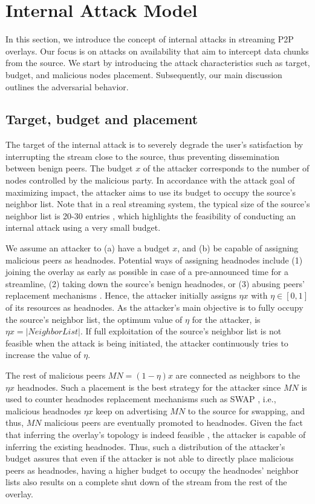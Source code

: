 \section{Internal Attack Model}
\label{sec:Attack}

In this section, we introduce the concept of internal attacks in streaming P2P overlays.
Our focus is on attacks on availability that aim to intercept data chunks from the source. 
We start by introducing the attack characteristics such as target, budget, and malicious nodes placement. 
Subsequently, our main discussion outlines the \drop adversarial behavior. 

\subsection{Target, budget and placement}


The target of the internal attack is to severely degrade the user's satisfaction by interrupting the stream close to the source, thus preventing dissemination between benign peers.
The budget $x$ of the attacker corresponds to the number of nodes controlled by the malicious party. 
In accordance with the attack goal of maximizing impact, the attacker aims to use its budget to occupy the source's neighbor list. 
Note that in a real streaming system, the typical size of the source's neighbor list is 20-30 entries \cite{neighborlist1,neighborlist2}, which highlights the feasibility of conducting an internal attack using a very small budget.


We assume an attacker to (a) have a budget $x$, and (b) be capable of assigning malicious peers as headnodes.
Potential ways of assigning headnodes include (1) joining the overlay as early as possible in case of a pre-announced time for a streamline, (2) taking down the source's benign headnodes, or (3) abusing peers' replacement mechanisms \cite{nguyen2016swap}.
Hence, the attacker initially assigns $\eta x$ with $\eta\in [0,1]$ of its resources as headnodes.
As the attacker's main objective is to fully occupy the source's neighbor list, the optimum value of $\eta$ for the attacker, is $\eta x = |NeighborList|$.
If full exploitation of the source's neighbor list is not feasible when the attack is being initiated, the attacker continuously tries to increase the value of $\eta$.  

The rest of malicious peers $MN=(1-\eta) x$ are connected as neighbors to the $\eta x$ headnodes. 
Such a placement is the best strategy for the attacker since $MN$ is used to counter headnodes replacement mechanisms such as SWAP \cite{nguyen2016swap}, i.e., malicious headnodes $\eta x$ keep on advertising $MN$ to the source for swapping, and thus, $MN$ malicious peers are eventually promoted to headnodes. 
Given the fact that inferring the overlay's topology is indeed feasible \cite{nguyen2016swap,rbcs}, the attacker is capable of inferring the existing headnodes.
Thus, such a distribution of the attacker's budget assures that even if the attacker is not able to directly place malicious peers as headnodes, having a higher budget to occupy the headnodes' neighbor lists also results on a complete shut down of the stream from the rest of the overlay.



